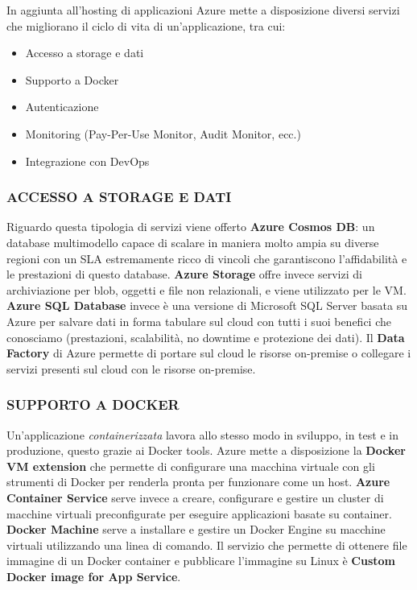 In aggiunta all'hosting di applicazioni Azure mette a disposizione diversi servizi che migliorano il ciclo di vita di un'applicazione, tra cui:
\begin{itemize}
    \item Accesso a storage e dati
    \item Supporto a Docker
    \item Autenticazione
    \item Monitoring (Pay-Per-Use Monitor, Audit Monitor, ecc.)
    \item Integrazione con DevOps
\end{itemize}

\subsubsection{\textbf{ACCESSO A STORAGE E DATI}}
Riguardo questa tipologia di servizi viene offerto \textbf{Azure Cosmos DB}: un database multimodello capace di scalare in maniera molto ampia su diverse regioni con un SLA estremamente ricco di vincoli che garantiscono l'affidabilità e le prestazioni di questo database. \textbf{Azure Storage} offre invece servizi di archiviazione per blob, oggetti e file non relazionali, e viene utilizzato per le VM. \textbf{Azure SQL Database} invece è una versione di Microsoft SQL Server basata su Azure per salvare dati in forma tabulare sul cloud con tutti i suoi benefici che conosciamo (prestazioni, scalabilità, no downtime e protezione dei dati). Il \textbf{Data Factory} di Azure permette di portare sul cloud le risorse on-premise o collegare i servizi presenti sul cloud con le risorse on-premise.

\subsubsection{\textbf{SUPPORTO A DOCKER}}
Un'applicazione \textit{containerizzata} lavora allo stesso modo in sviluppo, in test e in produzione, questo grazie ai Docker tools. Azure mette a disposizione la \textbf{Docker VM extension} che permette di configurare una macchina virtuale con gli strumenti di Docker per renderla pronta per funzionare come un host. \textbf{Azure Container Service} serve invece a creare, configurare e gestire un cluster di macchine virtuali preconfigurate per eseguire applicazioni basate su container. \textbf{Docker Machine} serve a installare e gestire un Docker Engine su macchine virtuali utilizzando una linea di comando. Il servizio che permette di ottenere file immagine di un Docker container e pubblicare l'immagine su Linux è \textbf{Custom Docker image for App Service}.

